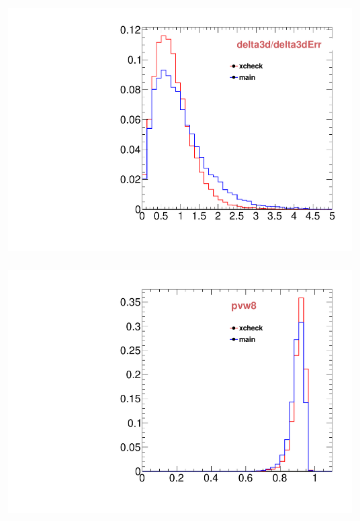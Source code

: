 \begin{figure}
\begin{subfigure}[b]{0.2\textwidth}
                \includegraphics[width=\textwidth]{Figures/VariablesComparison/MC_endcaps_figs/pvips}
                \label{fig:MC_endcaps_pvips}
        \end{subfigure}
        \begin{subfigure}[b]{0.2\textwidth}
                \centering
                \includegraphics[width=\textwidth]{Figures/VariablesComparison/MC_endcaps_figs/pvw8}
                \label{fig:MC_endcaps_pvw8}
        \end{subfigure}
        \begin{subfigure}[b]{0.2\textwidth}
                \centering

\end{subfigure}
\end{figure}
